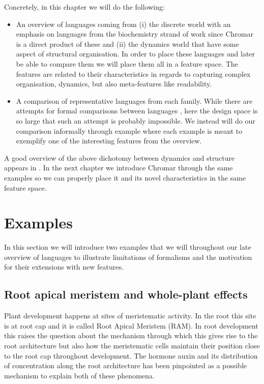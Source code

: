 \documentclass[phd]{infthesis}
\begin{document}
Concretely, in this chapter we will do the following:
\begin{itemize}
\item An overview of languages coming from (i) the discrete world with an
emphasis on languages from the biochemistry strand of work since Chromar is a
direct product of these and (ii) the dynamics world that have some aspect of
structural organisation. In order to place these languages and later be able to
compare them we will place them all in a feature space. The features are related
to their characteristics in regards to capturing complex organisation, dynamics,
but also meta-features like readability.
\item A comparison of representative languages from each family. While there are
attempts for formal comparisons between languages
\citep{felleisen1991expressive}, here the design space is so large that such an
attempt is probably impossible. We instead will do our comparison informally
through example where each example is meant to exemplify one of the interesting
features from the overview.
\end{itemize}
A good overview of the above dichotomy between dynamics and structure appears in
\citet{fontana1996barrier}.
In the next chapter  we introduce Chromar through the same examples so we can
properly place it and its novel characteristics in the same feature space.


\section{Examples}
In this section we will introduce two examples that we will throughout our late
overview of languages to illustrate limitations of formalisms and the motivation
for their extensions with new features.

\subsection{Root apical meristem and whole-plant effects}
Plant development happens at sites of meristematic activity. In the root this
site is at root cap and it is called Root Apical Meristem (RAM). In root
development this raises the question about the mechanism through which this gives
rise to the root architecture but also how the meristematic cells maintain their
position close to the root cap throughout development. The hormone auxin and its
distribution of concentration along the root architecture has been pinpointed as
a possible mechanism to explain both of these phenomena.
\end{document}
